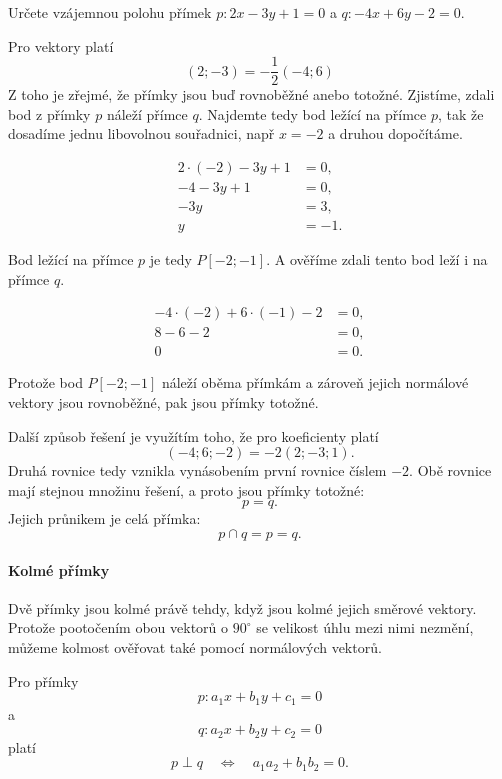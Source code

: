 \begin{example}\label{exa:Coincident_general_lines}
    Určete vzájemnou polohu přímek $p:2x-3y+1=0$ a $q:-4x+6y-2=0$.

    Pro vektory platí
    \[
        (2;-3) = -\frac{1}{2}(-4;6)
    \]
    Z toho je zřejmé, že přímky jsou buď rovnoběžné anebo totožné.
    Zjistíme, zdali bod z přímky $p$ náleží přímce $q$. Najdemte tedy bod ležící na přímce $p$,
    tak že dosadíme jednu libovolnou souřadnici, např $x = -2$ a druhou dopočítáme. 

    \begin{align*}
        2 \cdot (-2) - 3y + 1 &= 0, \\
        -4 -3y +1 &= 0, \\
        -3y &= 3, \\
        y &= -1.
    \end{align*}

    Bod ležící na přímce $p$ je tedy $P[-2;-1]$. A ověříme zdali tento bod leží i na přímce $q$.

    \begin{align*}
        -4 \cdot (-2) + 6 \cdot (-1) - 2 &= 0, \\
        8 - 6 - 2 &= 0, \\
        0 &= 0.
    \end{align*}

    Protože bod $P[-2;-1]$ náleží oběma přímkám a zároveň jejich normálové vektory jsou rovnoběžné,
    pak jsou přímky totožné.

    Další způsob řešení je využítím toho, že pro koeficienty platí
    \[
        (-4;6;-2)=-2(2;-3;1).
    \]
    Druhá rovnice tedy vznikla vynásobením první rovnice číslem $-2$.
    Obě rovnice mají stejnou množinu řešení, a proto jsou přímky
    totožné:
    \[
        p=q.
    \]
    Jejich průnikem je celá přímka:
    \[
        p\cap q=p=q.
    \]
\end{example}

\paragraph{Kolmé přímky}
\label{subsubsec:Perpendicular_general_lines}

Dvě přímky jsou kolmé právě tehdy, když jsou kolmé jejich směrové
vektory. Protože pootočením obou vektorů o $90^\circ$ se velikost úhlu
mezi nimi nezmění, můžeme kolmost ověřovat také pomocí normálových
vektorů.

Pro přímky
\[
    p:a_1x+b_1y+c_1=0
\]
a
\[
    q:a_2x+b_2y+c_2=0
\]
platí
\begin{equation}\label{eq:Perpendicular_general_lines}
    p\perp q
    \quad\Longleftrightarrow\quad
    a_1a_2+b_1b_2=0.
\end{equation}

